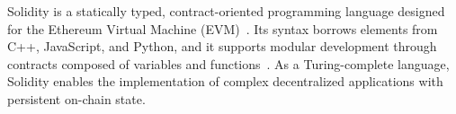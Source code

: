\documentclass[10pt, conference]{IEEEtran}
\begin{document}

Solidity is a statically typed, contract-oriented programming language designed for the Ethereum Virtual Machine (EVM)~\cite{solidity, soldom}. Its syntax borrows elements from C++, JavaScript, and Python, and it supports modular development through contracts composed of variables and functions~\cite{soldom, solinf}. As a Turing-complete language, Solidity enables the implementation of complex decentralized applications with persistent on-chain state.
\end{document}
